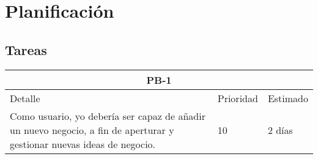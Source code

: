 \chapter{Planificación}
\section{Tareas}
\begin{table}[htbp]
	\begin{center}
		\begin{tabular}{|p{10cm} | p{2cm} | p{2cm}|}
			\hline
			\multicolumn{3}{|c|}{PB-1}\\
			\hline
			Detalle & Prioridad & Estimado \\
			\hline
			Como usuario, yo debería ser capaz de añadir un nuevo negocio, a fin de aperturar y gestionar nuevas ideas de negocio. & 10 & 2 días \\
			\hline	
		\end{tabular}
	\end{center}
\end{table}